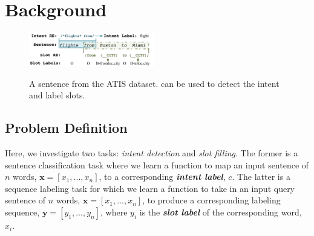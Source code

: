 \section{Background}
\begin{figure}[t!]
  \centering
  \includegraphics[width=0.49\textwidth]{figure/motivation.pdf}\\
  \caption{A sentence from the ATIS dataset. \REs can be used to detect the intent and label slots.}
  \label{atis_sample}
\end{figure}

\subsection{Problem Definition}
Here, we investigate two \SLU tasks: \emph{intent
detection} and \emph{slot filling}. The former is a sentence classification task where we learn a function to map an input sentence of $n$
words, $\textbf{x}=[x_{1}, ..., x_{n}]$, to a corresponding \textbf{\emph{intent label}}, $c$. The latter is a sequence labeling task for
which we learn a function to take in an input query sentence of $n$ words, $\textbf{x}=[x_{1}, ..., x_{n}]$, to produce a corresponding
labeling sequence, $\textbf{y}=[y_{1}, ..., y_{n}]$, where  $y_i$ is the \textbf{\emph{slot label}} of the
corresponding word, $x_i$. %


%

